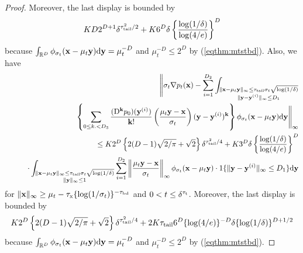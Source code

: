 \documentclass[twoside,11pt]{article}
\newcommand{\bk}{{\bf k}}
\newcommand{\bx}{{\bf x}}
\newcommand{\by}{{\bf y}}
\newcommand{\bbR}{{\mathbb R}}
\newcommand{\be}{\begin{equation}}
\newcommand{\ee}{\end{equation}}
\newcommand{\bean}{\setlength\arraycolsep{1pt}\begin{eqnarray*}}
\newcommand{\eean}{\end{eqnarray*}}
\def\d{{\rm d}}
\def\D{{\rm D}}
\begin{document}
\begin{proof}
Moreover, the last display is bounded by
\be
 K D 2^{D+1} \delta^{ \tau_{\rm tail}^2 / 2 } + K  6^{D} \delta \left\{ \frac{\log (1/\delta) }{\log (4/e)} \right\}^{D} \label{eqprop2:p0errorbd}
\ee
because $\int_{\bbR^{D}} \phi_{\sigma_t}(\bx-\mu_t \by) \d \by = \mu_t^{-D}$ and $\mu_t^{-D} \leq 2^{D}$ by (\ref{eqthm:mtstbd}).
Also, we have
\bean
&& \Bigg\| \sigma_{t} \nabla p_t(\bx) -  \sum_{i=1}^{D_{2}} \int_{ \substack{ \| \bx-\mu_{t}\by \|_{\infty} \leq \tau_{\rm tail} \sigma_{t} \sqrt{ \log ( 1 / \delta ) }
\\ \| \by - \by^{(i)} \|_{\infty} \leq D_{1} } } 
\\
&& \qquad \left\{  \sum_{0\leq k. < D_{3}}  \frac{(\D^{\bk} p_0 )(\by^{(i)}) }{\bk !}    \left(\frac{ \mu_t \by - \bx  }{\sigma_t} \right)   (\by - \by^{(i)})^{\bk} \right\}
 \phi_{\sigma_{t}}(\bx-\mu_{t} \by) \d \by \Bigg\|_{\infty}
 \\
 && \leq   K 2^{D} \left\{ 2 (D-1) \sqrt{2 / \pi} + \sqrt{2}  \right\} \delta^{\tau_{\rm tail}^2 / 4 }  +      K3^{D} \delta \left\{ \frac{\log (1/\delta) }{\log (4/e)} \right\}^{D}
 \\
 && \qquad \cdot \int_{ \substack{ \| \bx-\mu_{t}\by \|_{\infty} \leq \tau_{\rm tail} \sigma_{t} \sqrt{ \log ( 1 / \delta ) }
\\ \| \by \|_{\infty} \leq 1}} \sum_{i=1}^{D_{2}}  \left\| \frac{ \mu_t \by - \bx  }{\sigma_t} \right\|_{\infty}  \phi_{\sigma_{t}}(\bx-\mu_{t} \by) \cdot 1\{ \| \by - \by^{(i)} \|_{\infty} \leq D_{1} \}    \d \by   
\eean
for $\| \bx \|_{\infty} \geq \mu_{t} - \tau_{\rm x} \{ \log(1/\sigma_t) \}^{-\tau_{\rm bd}}$ and $0 < t \leq \delta^{\tau_{\rm t}}$.
Moreover, the last display is bounded by
\be
 K 2^{D} \left\{ 2 (D-1) \sqrt{2 / \pi} + \sqrt{2}  \right\} \delta^{\tau_{\rm tail}^2 / 4 }    +  2 K  \tau_{\rm tail}    6^{D} \{ \log (4/e) \}^{-D} \delta \{ \log ( 1 / \delta) \}^{D + 1/2}
 \label{eqprop2:p0errorbdgrad}
\ee
because $\int_{\bbR^{D}} \phi_{\sigma_t}(\bx-\mu_t \by) \d \by = \mu_t^{-D}$ and $\mu_t^{-D} \leq 2^{D}$ by (\ref{eqthm:mtstbd}).


\end{proof}
\end{document}
